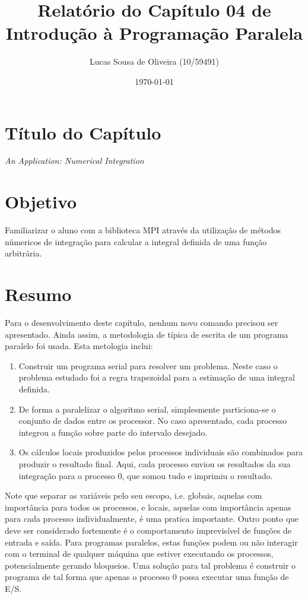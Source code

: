 \documentclass[11pt,a4paper,onecolumn]{article}
\title{Relatório do Capítulo 04 de\\Introdução à Programação Paralela}
\author{Lucas Sousa de Oliveira (10/59491)}
\date{\today}
\begin{document}
\maketitle

\section{Título do Capítulo}
\textit{An Application: Numerical Integration}

\section{Objetivo}
Familiarizar o aluno com a biblioteca MPI através da utilização de métodos númericos de integração para calcular a integral definida de uma função arbitrária.

\section{Resumo}
\label{sec:resumo}
Para o desenvolvimento deste capítulo, nenhum novo comando precisou ser apresentado.
Ainda assim, a metodologia de típica de escrita de um programa paralelo foi usada.
Esta metologia inclui:
\begin{enumerate}
\item Construir um programa serial para resolver um problema.
Neste caso o problema estudado foi a regra trapezoidal para a estimação de uma integral definida.
\item De forma a paralelizar o algoritmo serial, simplesmente particiona-se o conjunto de dados entre os processor.
No caso apresentado, cada processo integrou a função sobre parte do intervalo desejado.
\item Os cálculos locais produzidos pelos processos individuais são combinados para produzir o resultado final.
Aqui, cada processo enviou os resultados da sua integração para o processo 0, que somou tudo e imprimiu o resultado.
\end{enumerate}

Note que separar as variáveis pelo seu escopo, i.e. globais, aquelas com importância para todos os processos, e locais, aquelas com importância apenas para cada processo individualmente, é uma pratica importante.
Outro ponto que deve ser considerado fortemente é o comportamento imprevisível de funções de entrada e saída.
Para programas paralelos, estas funções podem ou não interagir com o terminal de qualquer máquina que estiver executando os processos, potencialmente gerando bloqueios.
Uma solução para tal problema é construir o programa de tal forma que apenas o processo 0 possa executar uma função de E/S.
\end{document}
